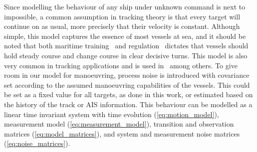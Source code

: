 Since modelling the behaviour of any ship under unknown command is next to impossible, a common assumption in tracking theory is that every target will continue on as usual, more precisely that their velocity is constant. Although simple, this model captures the essence of most vessels at sea, and it should be noted that both maritime training~\cite{Allen2005} and regulation~\cite{IMO1972} dictates that vessels should hold steady course and change course in clear decisive turns. This model is also very common in tracking applications and is used in~\cite{Reid1979,Coraluppi2000,Brekke2012,Wilthil,Vo2015,Chen2003,Habtemariam2015} among others. To give room in our model for manoeuvring, process noise is introduced with covariance set according to the assumed manoeuvring capabilities of the vessels. This could be set as a fixed value for all targets, as done in this work, or estimated based on the history of the track or AIS information. This behaviour can be modelled as a linear time invariant system with time evolution (\ref{eq:motion_model}), measurement model (\ref{eq:measurement_model}), transition and observation matrices (\ref{eq:model_matrices}), and system and measurement noise matrices (\ref{eq:noise_matrices}).

